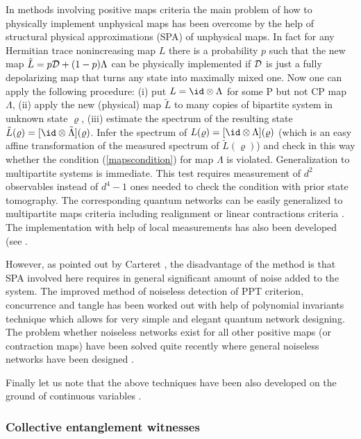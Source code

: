 \documentclass[rmp,12pt,preprint]{revtex4-2}
\begin{document}
In methods involving positive maps criteria the main problem of how
to physically implement unphysical maps has been overcome by the
help of structural physical approximations (SPA) of unphysical maps.
In fact for any Hermitian trace nonincreasing map $L$ there is a
probability $p$ such that the new map $\tilde{L}=p{\cal D} +
(1-p)\Lambda$ can be physically implemented if ${\cal D}$ is just a
fully depolarizing map that turns any state into maximally
mixed one. Now one can apply the following procedure: (i) put $L=\id
\otimes \Lambda$ for some P but not CP map $\Lambda$, (ii) apply the
new (physical) map $\tilde{L}$ to many copies of bipartite system in
unknown state $\varrho$, (iii) estimate the spectrum of the
resulting state $\tilde{L}(\varrho)=[\id \otimes
\tilde{\Lambda}](\varrho)$. Infer the spectrum of $L(\varrho)=[\id
\otimes \Lambda](\varrho)$ (which is an easy affine transformation
of the measured spectrum of $\tilde{ L}(\varrho)$) and check in this
way whether the condition (\ref{mapscondition}) for map $\Lambda$ is
violated. Generalization to multipartite systems is immediate. This
test requires measurement of $d^{2}$ observables instead of
$d^{4}-1$ ones needed to check the condition with prior state
tomography. The corresponding quantum networks can be easily
generalized to multipartite maps criteria including realignment or
linear contractions criteria \cite{reshuff}. The implementation with
help of local measurements has also been developed (see
\cite{LOCCmapsdetection}.

However, as pointed out by Carteret \cite{Carteret}, the disadvantage
of the method is that SPA involved here requires in general
significant amount of noise added to the system. The improved method
of noiseless detection of PPT criterion, concurrence and tangle has
been worked out \cite{Carteret,Carteret2003-tangle} with help of polynomial invariants
technique which allows for very simple and elegant quantum network
designing. The problem whether noiseless networks exist for all other
positive maps (or contraction maps) have been solved quite recently
where general noiseless networks have been designed \cite{Noiseless}.

Finally let us note that the above techniques have been also developed
on the ground of continuous variables
\cite{FiurasekCerf,StobinskaW-teor-s,Pregnell}.


\subsubsection{Collective entanglement witnesses \label{subsubsec:CollectiveWitnesses}}
\end{document}
